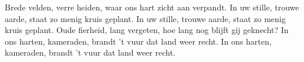 \beginverse*
Brede velden, verre heiden,
waar ons hart zicht aan verpandt.
In uw stille, trouwe aarde,
staat zo menig kruis geplant.
In uw stille, trouwe aarde,
staat zo menig kruis geplant.
\endverse
\beginverse*
Oude fierheid, lang vergeten,
hoe lang nog blijft gij geknecht?
In ons harten, kameraden,
brandt 't vuur dat land weer recht.
In ons harten, kameraden,
brandt 't vuur dat land weer recht.
\endverse
\endsong
